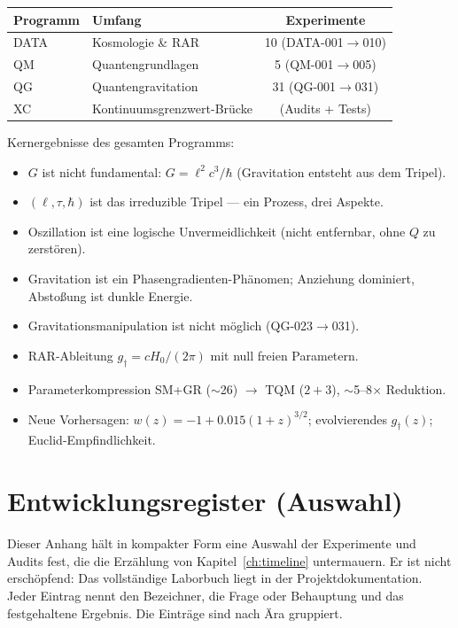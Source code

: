 \documentclass[10pt,twoside,openany]{book}
\begin{document}
\begin{center}
\begin{tabular}{llc}
\toprule
Programm & Umfang & Experimente \\
\midrule
DATA & Kosmologie \& RAR & 10 (DATA-001$\to$010) \\
QM & Quantengrundlagen & 5 (QM-001$\to$005) \\
QG & Quantengravitation & 31 (QG-001$\to$031) \\
XC & Kontinuumsgrenzwert-Brücke & (Audits + Tests) \\
\bottomrule
\end{tabular}
\end{center}

Kernergebnisse des gesamten Programms:
\begin{itemize}
\item $G$ ist nicht fundamental: $G=\ell^2c^3/\hbar$ (Gravitation entsteht aus dem
Tripel).
\item $(\ell,\tau,\hbar)$ ist das irreduzible Tripel — ein Prozess, drei Aspekte.
\item Oszillation ist eine logische Unvermeidlichkeit (nicht entfernbar, ohne $Q$ zu
zerstören).
\item Gravitation ist ein Phasengradienten-Phänomen; Anziehung dominiert, Abstoßung ist
dunkle Energie.
\item Gravitationsmanipulation ist nicht möglich (QG-023$\to$031).
\item RAR-Ableitung $g_\dagger=cH_0/(2\pi)$ mit null freien Parametern.
\item Parameterkompression SM+GR ($\sim$26) $\to$ TQM ($2{+}3$), $\sim$5--8$\times$
Reduktion.
\item Neue Vorhersagen: $w(z)=-1+0.015(1+z)^{3/2}$; evolvierendes $g_\dagger(z)$;
Euclid-Empfindlichkeit.
\end{itemize}

\chapter{Entwicklungsregister (Auswahl)}
\label{app:ledger}

Dieser Anhang hält in kompakter Form eine Auswahl der Experimente und Audits fest, die
die Erzählung von Kapitel~\ref{ch:timeline} untermauern. Er ist nicht erschöpfend: Das
vollständige Laborbuch liegt in der Projektdokumentation. Jeder Eintrag nennt den
Bezeichner, die Frage oder Behauptung und das festgehaltene Ergebnis. Die Einträge sind
nach Ära gruppiert.
\end{document}
